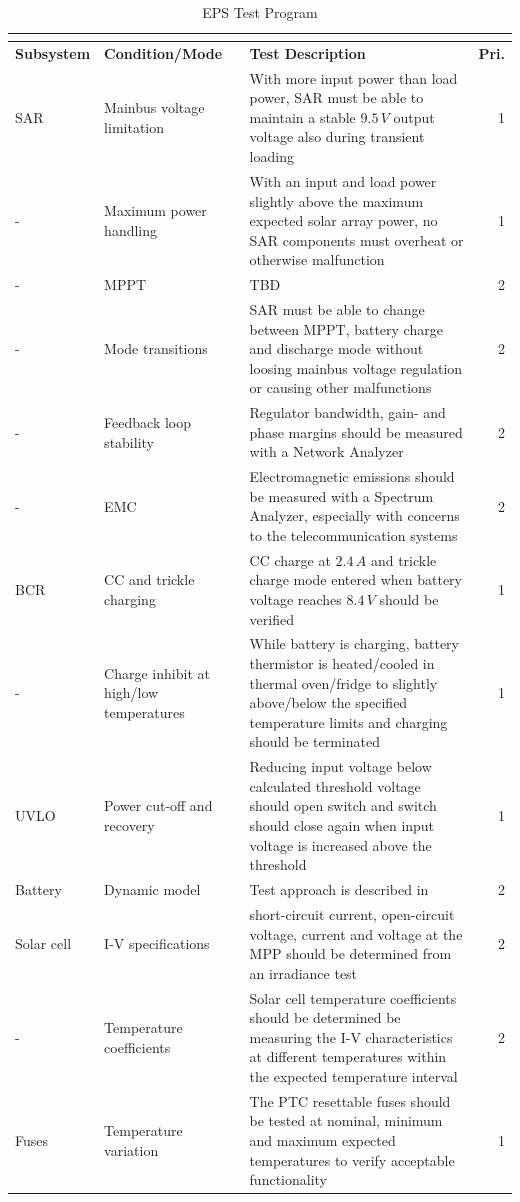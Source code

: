 \begin{center}
\begin{longtable}[H]{p{}p{}p{}r}
\caption{EPS Test Program}\\
\label{tab:test_program}\\[-0.5cm]
\hline
\textbf{Subsystem} & \textbf{Condition/Mode} & \textbf{Test Description} & \textbf{Pri.}\\
\hline
\ac{SAR} & Mainbus voltage limitation & With more input power than load power, \ac{SAR} must be able to maintain a stable $9.5\,V$ output voltage also during transient loading & 1\\
- & Maximum power handling & With an input and load power slightly above the maximum expected solar array power, no \ac{SAR} components must overheat or otherwise malfunction & 1 \\
- & \ac{MPPT} & \ac{TBD} & 2\\
- & Mode transitions & \ac{SAR} must be able to change between \ac{MPPT}, battery charge and discharge mode without loosing mainbus voltage regulation or causing other malfunctions & 2\\
- & Feedback loop stability & Regulator bandwidth, gain- and phase margins should be measured with a Network Analyzer & 2\\
- & \ac{EMC} & Electromagnetic emissions should be measured with a Spectrum Analyzer, especially with concerns to the telecommunication systems & 2\\
\hline
\ac{BCR} & \ac{CC} and trickle charging & \ac{CC} charge at $2.4\,A$ and trickle charge mode entered when battery voltage reaches $8.4\,V$ should be verified & 1\\
- & Charge inhibit at high/low temperatures & While battery is charging, battery thermistor is heated/cooled in thermal oven/fridge to slightly above/below the specified temperature limits and charging should be terminated & 1\\
\hline
\ac{UVLO} & Power cut-off and recovery & Reducing input voltage below calculated threshold voltage should open switch and switch should close again when input voltage is increased above the threshold & 1\\
\hline
Battery & Dynamic model & Test approach is described in \cite{chen} & 2\\
\hline
Solar cell & I-V specifications & short-circuit current, open-circuit voltage, current and voltage at the \ac{MPP} should be determined from an irradiance test & 2\\
- & Temperature coefficients & Solar cell temperature coefficients should be determined be measuring the I-V characteristics at different temperatures within the expected temperature interval & 2\\
\hline
Fuses & Temperature variation & The \ac{PTC} resettable fuses should be tested at nominal, minimum and maximum expected temperatures to verify acceptable functionality & 1\\
\hline
\end{longtable}
\end{center}
%

